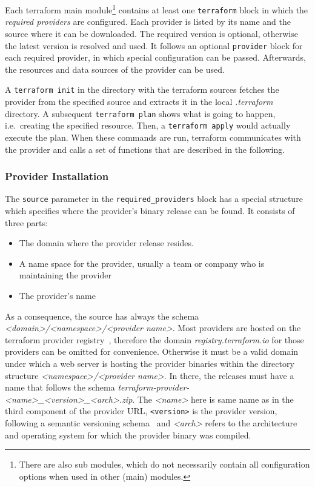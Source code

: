 \documentclass[paper=a4,11pt,numbers=noenddot]{article}
\begin{document}
Each terraform main module\footnote{There are also sub modules, which do not necessarily contain all configuration options when used in other (main) modules.} contains at least one \verb'terraform' block in which the \emph{required providers} are configured. Each provider is listed by its name and the source where it can be downloaded. The required version is optional, otherwise the latest version is resolved and used. It follows an optional \verb'provider' block for each required provider, in which special configuration can be passed. Afterwards, the resources and data sources of the provider can be used.

A \verb'terraform init' in the directory with the terraform sources fetches the provider from the specified source and extracts it in the local \emph{.terraform} directory. A subsequent \verb'terraform plan' shows what is going to happen, i.e.\ creating the specified resource. Then, a \verb'terraform apply' would actually execute the plan. When these commands are run, terraform communicates with the provider and calls a set of functions that are described in the following.


\subsubsection{Provider Installation}
\label{subsubsec:prov-inst}

The \verb'source' parameter in the \verb'required_providers' block has a special structure which specifies where the provider's binary release can be found. It consists of three parts:

\begin{itemize}
\item The domain where the provider release resides.
\item A name space for the provider, usually a team or company who is maintaining the provider
\item The provider's name
\end{itemize}

As a consequence, the source has always the schema \emph{<domain>/<namespace>/<provider name>}. Most providers are hosted on the terraform provider registry~\autocite{noauthor_terraform_registry_nodate}, therefore the domain \emph{registry.terraform.io} for those providers can be omitted for convenience. Otherwise it must be a valid domain under which a web server is hosting the provider binaries within the directory structure \emph{<namespace>/<provider name>}. In there, the releases must have a name that follows the schema \emph{terraform-provider-<name>\_<version>\_<arch>.zip}. The \emph{<name>} here is same name as in the third component of the provider URL, \verb'<version>' is the provider version, following a semantic versioning schema~\autocite{preston-werner_semantic_versioning_nodate} and \emph{<arch>} refers to the architecture and operating system for which the provider binary was compiled.
\end{document}
